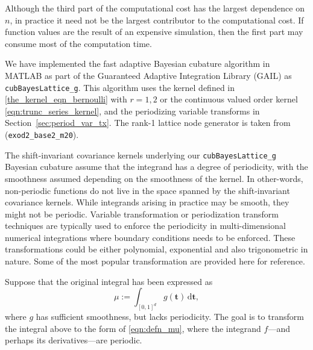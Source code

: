 \documentclass{iitthesis}          %
\newcommand{\bm}[1]{\boldsymbol{#1}}
\newcommand{\dif}[1]{\text{d}{#1}}
\newcommand{\vt}{\bm{t}}
\newcommand{\code}[1]{\texttt{#1}}
\newcommand\secref{Section~\ref}
\begin{document}
Although the third part of the computational cost has the largest dependence on $n$, in practice it need not be the largest contributor to the computational cost.  If function values are the result of an expensive simulation, then the first part may consume most of the computation time.

We have implemented the fast adaptive Bayesian cubature algorithm in MATLAB as part of the Guaranteed Adaptive Integration Library (GAIL) \cite{ChoEtal17b} as \allowbreak \\ \code{cubBayesLattice\_g}. This algorithm uses the kernel defined in  \eqref{the_kernel_eqn_bernoulli} with  $r=1,2$ or the continuous valued order kernel \eqref{eqn:trunc_series_kernel}, and the periodizing variable transforms in \secref{sec:period_var_tx}. The rank-1 lattice node generator is taken from \cite{NuyMagic} (\code{exod2\_base2\_m20}).












\label{sec:period_var_tx}

The shift-invariant covariance kernels underlying our \code{cubBayesLattice\_g} \\
Bayesian cubature  assume that the integrand has a degree of periodicity, with the smoothness assumed depending on the smoothness of the kernel.  
In other-words, non-periodic functions do not live in the space spanned by the shift-invariant covariance kernels.
While integrands arising in practice may be smooth, they might not be periodic.  
Variable transformation or periodization transform techniques are typically used to enforce the periodicity in multi-dimensional numerical integrations where boundary conditions needs to be enforced. These transformations could be either polynomial, exponential and also trigonometric in nature. Some of the most popular transformation are provided here for reference. 

Suppose that the original integral has been expressed as 
\begin{equation*}
\mu := \int_{[0,1]^d} g(\vt) \, \dif \vt,
\end{equation*}
where $g$ has sufficient smoothness, but lacks periodicity.  
The goal is to transform the integral above to the form of \eqref{eqn:defn_mu}, where the integrand $f$---and perhaps its derivatives---are  periodic.  
\end{document}

